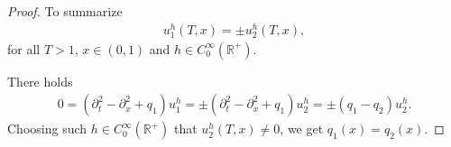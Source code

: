 \documentclass[10pt,a4paper]{amsart}
\def\R{\mathbb R}
\begin{document}
\begin{proof}
To summarize 
	\begin{align*}
u_1^h (T, x) = \pm u_2^h (T, x),
	\end{align*}
for all $T > 1$, $x \in (0,1)$ and $h \in C_0^\infty(\R^+)$.


There holds
	\begin{align*}
0 = (\partial_t^2 - \partial_x^2 + q_1) u_1^h 
= \pm (\partial_t^2 - \partial_x^2 + q_1) u_2^h 
= \pm (q_1 - q_2) u_2^h.
	\end{align*}
Choosing such $h \in C^\infty_0(\R^+)$ that $u_2^h(T,x) \ne 0$, we get 
$q_1(x) = q_2(x)$.
\end{proof}
\end{document}
